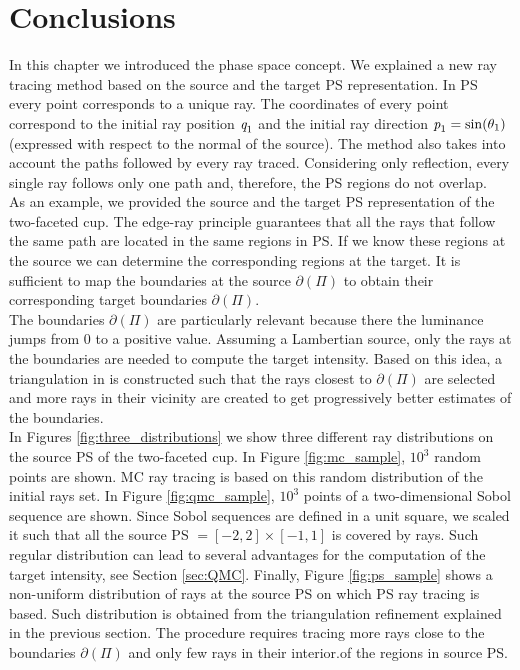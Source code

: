 \section{Conclusions}
In this chapter we introduced the phase space concept. 
We explained a new ray tracing method based on the source and the target PS representation. 
In PS every point corresponds to a unique ray. 
The coordinates of every point correspond to the initial ray position $\textit{q}_1$ and the initial ray direction $\textit{p}_1 = \sin(\theta_1)$ (expressed with respect to the normal of the source). The method also takes into account the paths followed by every ray traced.
Considering only reflection, every single ray follows only one path and, therefore, the PS regions do not overlap. 
\\ \indent
As an example, we provided the source and the target PS representation of the two-faceted cup.
The edge-ray principle guarantees that all the rays that follow the same path are located in the same regions in PS. If we know these regions at the source we can determine the corresponding regions at the target. 
It is sufficient to map the boundaries at the source $\partial$$(\Pi)$ to obtain their corresponding target boundaries $\partial$$(\Pi)$. \\ \indent
The boundaries $\partial$$(\Pi)$ are particularly relevant because there the luminance jumps from $0$ to a positive value. 
Assuming a Lambertian source, only the rays at the boundaries are needed to compute the target intensity. 
Based on this idea, a triangulation in  is constructed such that the rays closest to $\partial$$(\Pi)$
are selected and more rays in their vicinity are created to get progressively better estimates of the boundaries.
\\ \indent In Figures \ref{fig:three_distributions} we show three different ray distributions on the source PS of the two-faceted cup. In Figure \ref{fig:mc_sample}, $10^3$ random points are shown. MC ray tracing is based on this random distribution of the initial rays set. In Figure \ref{fig:qmc_sample}, $10^3$ points of a two-dimensional Sobol sequence are shown. 
Since Sobol sequences are defined in a unit square, we scaled it such that all the source PS $=[-2, 2]\times[-1, 1]$ is covered by rays. Such regular distribution can lead to several advantages for the computation of the target intensity, see Section \ref{sec:QMC}. Finally, Figure \ref{fig:ps_sample} shows a non-uniform distribution of rays at the source PS on which PS ray tracing is based. Such distribution is obtained from the triangulation refinement explained in the previous section. The procedure requires tracing more rays close to the boundaries $\partial$$(\Pi)$ and only few rays in their interior.of the regions in source PS. 

